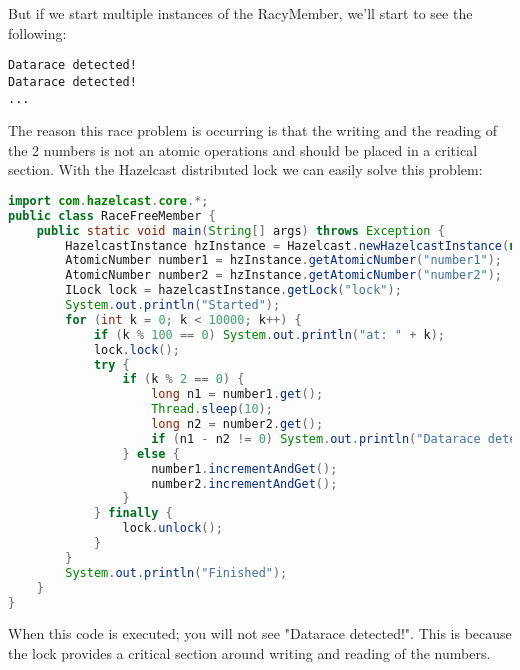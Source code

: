 But if we start multiple instances of the RacyMember, we'll start to see the following:
\begin{lstlisting}
Datarace detected!
Datarace detected!
...
\end{lstlisting}
The reason this race problem is occurring is that the writing and the reading of the 2 numbers is not an atomic operations and should be placed in a critical section. With the Hazelcast distributed lock we can easily solve this problem:
\begin{lstlisting}[language=java]
import com.hazelcast.core.*;
public class RaceFreeMember {
    public static void main(String[] args) throws Exception {
        HazelcastInstance hzInstance = Hazelcast.newHazelcastInstance(null);
        AtomicNumber number1 = hzInstance.getAtomicNumber("number1");
        AtomicNumber number2 = hzInstance.getAtomicNumber("number2");
        ILock lock = hazelcastInstance.getLock("lock");
        System.out.println("Started");
        for (int k = 0; k < 10000; k++) {
            if (k % 100 == 0) System.out.println("at: " + k);
            lock.lock();
            try {
                if (k % 2 == 0) {
                    long n1 = number1.get();
                    Thread.sleep(10);
                    long n2 = number2.get();
                    if (n1 - n2 != 0) System.out.println("Datarace detected!");
                } else {
                    number1.incrementAndGet();
                    number2.incrementAndGet();
                }
            } finally {
                lock.unlock();
            }
        }
        System.out.println("Finished");
    }
}
\end{lstlisting}
When this code is executed; you will not see "Datarace detected!". This is because the lock provides a critical section around writing and reading of the numbers. 

